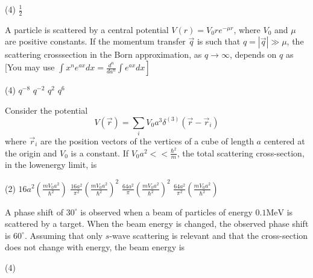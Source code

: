 \begin{enumerate}
\begin{minipage}{\textwidth}
\end{minipage}
\begin{tasks}(4)
	\task[\textbf{D.}]$\frac{1}{2}$
\end{tasks}
\begin{minipage}{\textwidth}
	\item A particle is scattered by a central potential $V(r)=V_{0} r e^{-\mu r}$, where $V_{0}$ and $\mu$ are positive constants. If the momentum transfer $\vec{q}$ is such that $q=|\vec{q}| \gg \mu$, the scattering crosssection in the Born approximation, as $q \rightarrow \infty$, depends on $q$ as
	[You may use $\left.\int x^{n} e^{a x} d x=\frac{d^{n}}{d a^{n}} \int e^{a x} d x\right]$
\end{minipage}
\begin{tasks}(4)
	\task[\textbf{A.}]$q^{-8}$
	\task[\textbf{B.}]$q^{-2}$
	\task[\textbf{C.}]$q^{2}$
	\task[\textbf{D.}]$q^{6}$
\end{tasks}
\begin{minipage}{\textwidth}
	\item Consider the potential
	$$
	V(\vec{r})=\sum_{i} V_{0} a^{3} \delta^{(3)}\left(\vec{r}-\vec{r}_{i}\right)
	$$
	where $\vec{r}_{i}$ are the position vectors of the vertices of a cube of length $a$ centered at the origin and $V_{0}$ is a constant. If $V_{0} a^{2}<<\frac{\hbar^{2}}{m}$, the total scattering cross-section, in the lowenergy limit, is
\end{minipage}
\begin{tasks}(2)
	\task[\textbf{A.}] $16 a^{2}\left(\frac{m V_{0} a^{2}}{\hbar^{2}}\right)$
	\task[\textbf{B.}]$\frac{16 a^{2}}{\pi^{2}}\left(\frac{m V_{0} a^{2}}{\hbar^{2}}\right)^{2}$
	\task[\textbf{C.}]$\frac{64 a^{2}}{\pi}\left(\frac{m V_{0} a^{2}}{\hbar^{2}}\right)^{2}$
	\task[\textbf{D.}]$\frac{64 a^{2}}{\pi^{2}}\left(\frac{m V_{0} a^{2}}{\hbar^{2}}\right)$
\end{tasks}
\begin{minipage}{\textwidth}
	\item A phase shift of $30^{\circ}$ is observed when a beam of particles of energy $0.1 \mathrm{MeV}$ is scattered by a target. When the beam energy is changed, the observed phase shift is $60^{\circ}$. Assuming that only $s$-wave scattering is relevant and that the cross-section does not change with energy, the beam energy is
\end{minipage}
\begin{tasks}(4)

\end{tasks}
\end{enumerate}
